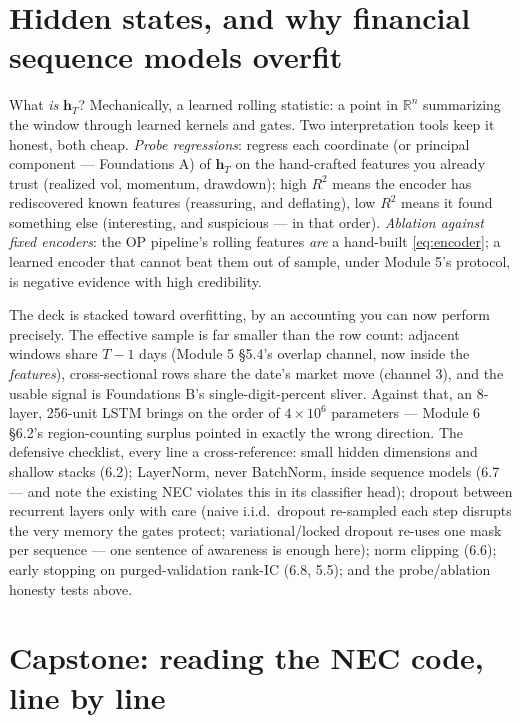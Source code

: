 \documentclass[11pt]{article}
\numberwithin{equation}{section}
\theoremstyle{plain}
\theoremstyle{definition}
\theoremstyle{remark}
\newcommand{\R}{\mathbb{R}}
\newcommand{\bh}{\bm{h}}
\begin{document}
\section{Hidden states, and why financial sequence models overfit}\label{sec:overfit}

What \emph{is} $\bh_T$? Mechanically, a learned rolling statistic: a point in $\R^n$ summarizing the window through learned kernels and gates. Two interpretation tools keep it honest, both cheap. \emph{Probe regressions}: regress each coordinate (or principal component --- Foundations A) of $\bh_T$ on the hand-crafted features you already trust (realized vol, momentum, drawdown); high $R^2$ means the encoder has rediscovered known features (reassuring, and deflating), low $R^2$ means it found something else (interesting, and suspicious --- in that order). \emph{Ablation against fixed encoders}: the OP pipeline's rolling features \emph{are} a hand-built \eqref{eq:encoder}; a learned encoder that cannot beat them out of sample, under Module 5's protocol, is negative evidence with high credibility.

The deck is stacked toward overfitting, by an accounting you can now perform precisely. The effective sample is far smaller than the row count: adjacent windows share $T - 1$ days (Module 5 \S5.4's overlap channel, now inside the \emph{features}), cross-sectional rows share the date's market move (channel 3), and the usable signal is Foundations B's single-digit-percent sliver. Against that, an 8-layer, 256-unit LSTM brings on the order of $4 \times 10^6$ parameters --- Module 6 \S6.2's region-counting surplus pointed in exactly the wrong direction. The defensive checklist, every line a cross-reference: small hidden dimensions and shallow stacks (6.2); LayerNorm, never BatchNorm, inside sequence models (6.7 --- and note the existing NEC violates this in its classifier head); dropout between recurrent layers only with care (naive i.i.d.\ dropout re-sampled each step disrupts the very memory the gates protect; variational/locked dropout re-uses one mask per sequence --- one sentence of awareness is enough here); norm clipping (6.6); early stopping on purged-validation rank-IC (6.8, 5.5); and the probe/ablation honesty tests above.

\section{Capstone: reading the NEC code, line by line}\label{sec:capstone}
\end{document}
